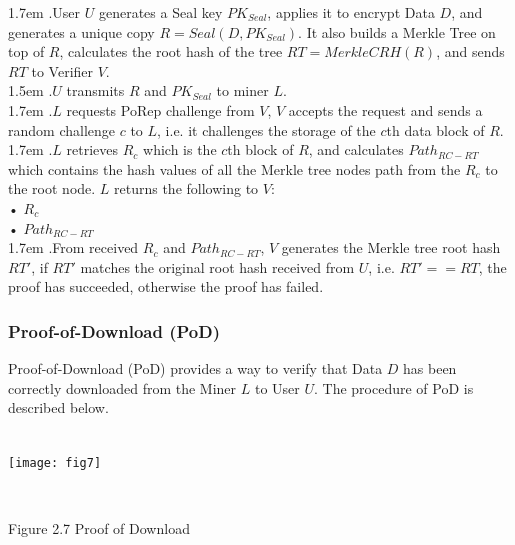\documentclass[10pt,a4paper]{article}
\begin{document}
\hangindent 1.7em
.\quad User $U$ generates a Seal key $PK_{Seal}$, applies it to encrypt Data $D$, and generates a unique copy $R=Seal(D, PK_{Seal})$. It also builds a Merkle Tree on top of $R$, calculates the root hash of the tree $RT=MerkleCRH(R)$, and sends $RT$ to Verifier $V$.
\vspace{-0.8em}
\\

\hangindent 1.5em
.\quad $U$ transmits $R$ and $PK_{Seal}$ to miner $L$.
\vspace{-0.8em}
\\

\hangindent 1.7em
.\quad $L$ requests PoRep challenge from $V$, $V$ accepts the request and sends a random challenge $c$ to $L$, i.e. it challenges the storage of the $c$th data block of $R$.
\vspace{-0.8em}
\\

\hangindent 1.7em
.\quad $L$ retrieves $R_{c}$ which is the $c$th block of $R$, and calculates $Path_{RC-RT}$ which contains the hash values of all the Merkle tree nodes path from the $R_{c}$ to the root node. $L$ returns the following to $V$:
\\•   $R_{c}$\\ 
     •  $Path_{RC-RT}$
     \vspace{-0.5em}
\\

\hangindent 1.7em
.\quad From received $R_{c}$ and $Path_{RC-RT}$, $V$ generates the Merkle tree root hash $RT'$, if $RT'$ matches the original root hash received from $U$, i.e. $RT' == RT$, the proof has succeeded, otherwise the proof has failed.  
\vspace{-0.5em}
\subsubsection{Proof-of-Download (PoD)}  %
Proof-of-Download (PoD) provides a way to verify that Data $D$ has been correctly downloaded from the Miner $L$ to User $U$. The procedure of PoD is described below.
\vspace{-0.5em}
\\ \\
\centerline{\texttt{[image: fig7]}}
 \\ \centerline{{Figure 2.7 Proof of Download}}
 \vspace{-1.5em}
\\
\end{document}
